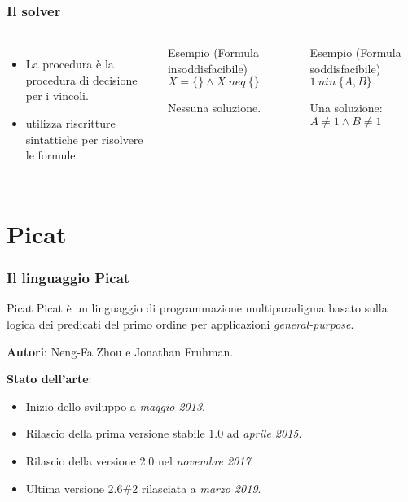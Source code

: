 \documentclass{beamer}
\begin{document}

\begin{frame}
  \frametitle{Il solver \satset{}}
  \begin{columns}[c]

    \begin{itemize}
    \item La procedura \satset{} è la procedura di decisione per i
      vincoli.
    \item \satset{} utilizza riscritture sintattiche per risolvere le
      formule.
    \end{itemize}

    \begin{exampleblock}{Esempio (Formula insoddisfacibile)}
      $X = \{\} \land X\ neq\ \{\}$
      
      Nessuna soluzione.
    \end{exampleblock}
    \begin{exampleblock}{Esempio (Formula soddisfacibile)}
      $1\ nin\ \{A, B\}$
      
      Una soluzione: $A \neq 1 \land B \neq 1$
    \end{exampleblock}
  \end{columns}
\end{frame}

\section{Picat}

\begin{frame}
  \frametitle{Il linguaggio Picat}
  \begin{block}{Picat}
    Picat è un linguaggio di programmazione multiparadigma basato
    sulla logica dei predicati del primo ordine per applicazioni
    \emph{general-purpose}.
  \end{block}

  \medskip

  \textbf{Autori}: Neng-Fa Zhou e Jonathan Fruhman.
  
  \textbf{Stato dell'arte}:
  \begin{itemize}
  \item Inizio dello sviluppo a \emph{maggio 2013}.
  \item Rilascio della prima versione stabile 1.0 ad \emph{aprile
    2015}.
  \item Rilascio della versione 2.0 nel \emph{novembre 2017}.
  \item Ultima versione 2.6\#2 rilasciata a \emph{marzo 2019}.
  \end{itemize}
\end{frame}
\end{document}
